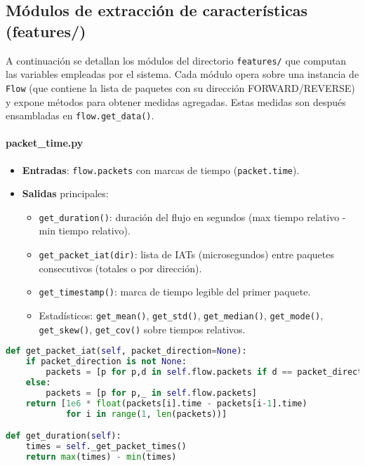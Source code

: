 \subsection{Módulos de extracción de características (features/)}

A continuación se detallan los módulos del directorio \texttt{features/} que computan las variables empleadas por el sistema. Cada módulo opera sobre una instancia de \texttt{Flow} (que contiene la lista de paquetes con su dirección FORWARD/REVERSE) y expone métodos para obtener medidas agregadas. Estas medidas son después ensambladas en \texttt{flow.get\_data()}.

\paragraph{packet\_time.py}
\begin{itemize}
  \item \textbf{Entradas}: \texttt{flow.packets} con marcas de tiempo (\texttt{packet.time}).
  \item \textbf{Salidas} principales:
    \begin{itemize}
      \item \texttt{get\_duration()}: duración del flujo en segundos (max tiempo relativo - min tiempo relativo).
      \item \texttt{get\_packet\_iat(dir)}: lista de IATs (microsegundos) entre paquetes consecutivos (totales o por dirección).
      \item \texttt{get\_timestamp()}: marca de tiempo legible del primer paquete.
      \item Estadísticos: \texttt{get\_mean()}, \texttt{get\_std()}, \texttt{get\_median()}, \texttt{get\_mode()}, \texttt{get\_skew()}, \texttt{get\_cov()} sobre tiempos relativos.
    \end{itemize}
\end{itemize}

\begin{lstlisting}[language=Python,caption={IATs y duración del flujo (extracto)},label=List.PacketTime]
def get_packet_iat(self, packet_direction=None):
    if packet_direction is not None:
        packets = [p for p,d in self.flow.packets if d == packet_direction]
    else:
        packets = [p for p,_ in self.flow.packets]
    return [1e6 * float(packets[i].time - packets[i-1].time)
            for i in range(1, len(packets))]

def get_duration(self):
    times = self._get_packet_times()
    return max(times) - min(times)
\end{lstlisting}

